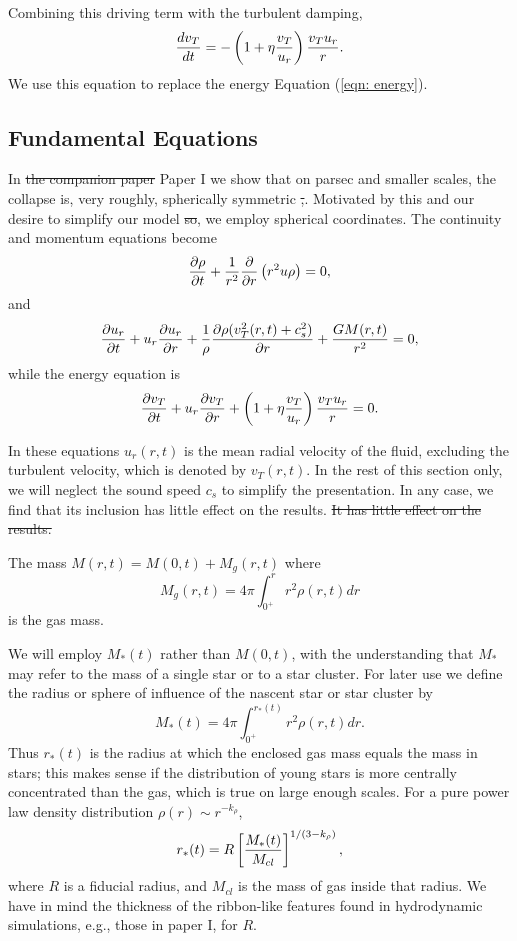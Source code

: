 \documentclass[iop,apj,numberedappendix]{emulateapj}
\newcommand       \phil[1]      {{\color{blue} #1}}
\newcommand       \be		{\begin{equation}}
\newcommand       \ee		{\end{equation}}
\newcommand       \etaeff       {\eta}
\begin{document}
Combining this driving term with the turbulent damping,
%
\be \label{eqn: simple energy} %
{d v_T\over dt} = 
-\left(1+\etaeff {v_T\over u_r}\right){v_Tu_r\over r}.
\ee  %
%
We use this equation to replace the energy Equation (\ref{eqn: energy}).

\subsection{Fundamental Equations}
In \phil{\sout{the companion paper} Paper I} we show that on parsec and smaller scales, the
collapse is, very roughly, spherically symmetric\phil{\sout{,}. Motivated by this and our desire to simplify our model \sout{ so},} we employ spherical
coordinates. The continuity and momentum equations become
%
\be \label{eqn: continuity}%
{\partial\rho\over \partial t}+{1\over r^2}{\partial\over\partial r}
\left(r^2u\rho\right) = 0,
\ee %
%
and
%
\be \label{eqn: momentum}%
{\partial u_r\over \partial t}+u_r{\partial u_r\over \partial r}
+{1\over \rho}{\partial \rho (v_T^2(r,t)+c_s^2)\over \partial r}+{GM(r,t)\over r^2}=0,
\ee %
%
while the energy equation is
%
\be \label{eqn: 1D energy}%
{\partial v_T\over \partial t}+ u_r{\partial v_T\over\partial r} +
\left(1+\etaeff {v_T\over u_r}\right){v_Tu_r\over r}=0.
\ee %
%

In these equations $u_r(r,t)$ is the mean radial velocity of the
fluid, excluding the turbulent velocity, which is denoted by
$v_T(r,t)$. In the rest of this section only, we will neglect the sound
speed $c_s$ to simplify the presentation. \phil{In any case, we find that its inclusion has little effect on the results. \sout{It has little effect on the results.}}

The mass $M(r,t)=M(0,t)+M_g(r,t)$ where
%
\be \label{eqn: mass}%
M_g(r,t)= 4\pi\int_{0^+}^r r^2\rho(r,t)dr
\ee %
%
is the gas mass.

We will employ $M_*(t)$ rather than $M(0,t)$, with the
understanding that $M_*$ may refer to the mass of a single star or to
a star cluster. For later use we define the radius or sphere of
influence of the nascent star or star cluster by
%
\be  \label{eqn: rstar}%
M_*(t) = 4\pi\int_{0^+}^{r_*(t)} r^2 \rho(r,t) dr.
\ee  %
%
Thus $r_*(t)$ is the radius at which the enclosed gas mass equals the
mass in stars; this makes sense if the distribution of young stars is more
centrally concentrated than the gas, which is true on large enough
scales. For a pure power law density distribution $\rho(r)\sim r^{-k_\rho}$,
%
\be %
r_*(t)=R\left[{M_*(t)\over M_{cl}}\right]^{1/(3-k_\rho)},
\ee %
%
where $R$ is a fiducial radius, and $M_{cl}$ is the mass of gas
inside that radius. We have in mind the thickness of the ribbon-like
features found in hydrodynamic simulations, e.g., those in paper I,
for $R$.
\end{document}
